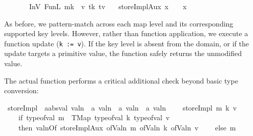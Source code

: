 \begin{isabellebody}
\ \ \ \ \ \ {\isacharequal}{\kern0pt}\ {\isacharparenleft}{\kern0pt}InV{}\ {\isacharparenleft}{\kern0pt}FunL\ {\isacharparenleft}{\kern0pt}m{\isacharparenleft}{\kern0pt}k\ {\isacharcolon}{\kern0pt}{\isacharequal}{\kern0pt}\ v{\isacharparenright}{\kern0pt}{\isacharparenright}{\kern0pt}\ tk\ tv{\isacharparenright}{\kern0pt}{\isacharparenright}{\kern0pt}{\isachardoublequoteclose}\isanewline
\ \ {\isacharbar}{\kern0pt}\ {\isachardoublequoteopen}storeImplAux\ x\ {\isacharunderscore}{\kern0pt}\ {\isacharunderscore}{\kern0pt}\ {\isacharequal}{\kern0pt}\ x{\isachardoublequoteclose}
\end{isabellebody}

As before, we pattern-match across each map level and its corresponding supported key levels.
However, rather than function application, we execute a function update (\lstinline[columns=fixed]{k := v}).
If the key level is absent from the domain, or if the update targets a primitive value, the function safely returns the unmodified value.

The actual  function performs a critical additional check beyond basic type conversion:

\begin{isabellebody}\isanewline
{}\isamarkupfalse%
\ storeImpl\ {\isacharcolon}{\kern0pt}{\isacharcolon}{\kern0pt}\ {\isachardoublequoteopen}{\isacharprime}{\kern0pt}a{\isacharcolon}{\kern0pt}{\isacharcolon}{\kern0pt}absval\ valn\ {\isasymRightarrow}\ {\isacharprime}{\kern0pt}a\ valn\ {\isasymRightarrow}\ {\isacharprime}{\kern0pt}a\ valn\ {\isasymRightarrow}\ {\isacharprime}{\kern0pt}a\ valn{\isachardoublequoteclose}\ 
\isanewline\ \isanewline
\ \ {\isachardoublequoteopen}storeImpl\ m\ k\ v\ {\isacharequal}{\kern0pt}\isanewline
\ \ \ \ {\isacharparenleft}{\kern0pt}if\ type{\isacharunderscore}{\kern0pt}of{\isacharunderscore}{\kern0pt}val\ m\ {\isacharequal}{\kern0pt}\ TMap\ {\isacharparenleft}{\kern0pt}type{\isacharunderscore}{\kern0pt}of{\isacharunderscore}{\kern0pt}val\ k{\isacharparenright}{\kern0pt}\ {\isacharparenleft}{\kern0pt}type{\isacharunderscore}{\kern0pt}of{\isacharunderscore}{\kern0pt}val\ v{\isacharparenright}{\kern0pt}\isanewline
\ \ \ \ then\ valnOf\ {\isacharparenleft}{\kern0pt}storeImplAux\ {\isacharparenleft}{\kern0pt}ofValn\ m{\isacharparenright}{\kern0pt}\ {\isacharparenleft}{\kern0pt}ofValn\ k{\isacharparenright}{\kern0pt}\ {\isacharparenleft}{\kern0pt}ofValn\ v{\isacharparenright}{\kern0pt}{\isacharparenright}{\kern0pt}\isanewline
\ \ \ \ else\ m{\isacharparenright}{\kern0pt}{\isachardoublequoteclose}%
\end{isabellebody}

